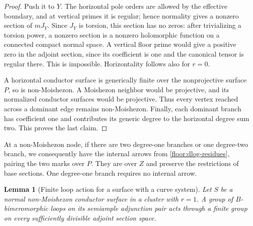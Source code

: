 \documentclass[11pt,letterpaper]{article}
\newtheorem{lemma}[theorem]{Lemma}
\theoremstyle{definition}
\theoremstyle{remark}
\begin{document}
\begin{proof}
Push it to $Y$.  The horizontal pole orders are allowed by the
effective boundary, and at vertical primes it is regular; hence
normality gives a nonzero section of $mJ_Y$.  Since $J_Y$ is
torsion, this section has no zeros: after trivializing a torsion
power, a nonzero section is a nonzero holomorphic function on a
connected compact normal space.  A vertical floor prime would
give a positive zero in the adjoint section, since its coefficient
is one and the canonical tensor is regular there.  This is
impossible.  Horizontality follows also for $r=0$.

A horizontal conductor surface is generically finite over the
nonprojective surface $P$, so is non-Moishezon.  A Moishezon
neighbor would be projective, and its normalized conductor
surfaces would be projective.  Thus every vertex reached across
a dominant edge remains non-Moishezon.  Finally, each dominant
branch has coefficient one and contributes its generic degree
to the horizontal degree sum two.  This proves the last claim.
\end{proof}

At a non-Moishezon node, if there are two degree-one branches or
one degree-two branch, we consequently have the internal arrows
from \eqref{floor:dlog-residues}, pairing the two marks over $P$.
They are over $Z$ and preserve the restrictions of base sections.
One degree-one branch requires no internal arrow.

\begin{lemma}[Finite loop action for a surface with a curve system]
\label{floor:nonprojective-loops}
Let $S$ be a normal non-Moishezon conductor surface in a cluster
with $r=1$.  A group of $B$-bimeromorphic loops on its semiample
adjunction pair acts through a finite group on every sufficiently
divisible adjoint section space.
\end{lemma}
\end{document}
